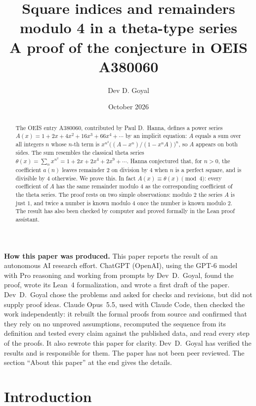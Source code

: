 \documentclass[11pt,a4paper]{article}
\title{Square indices and remainders modulo 4 in a theta-type series\\[6pt]\large A proof of the conjecture in OEIS A380060}
\author{Dev D. Goyal}
\date{October 2026}
\theoremstyle{definition}
\theoremstyle{remark}
\begin{document}
\maketitle
\begin{abstract}
The OEIS entry A380060, contributed by Paul D.~Hanna, defines a power series
$A(x)=1+2x+4x^2+16x^3+66x^4+\cdots$ by an implicit equation: $A$ equals a sum over all integers $n$ whose $n$-th term
is $x^{n^2}\bigl((A-x^n)/(1-x^nA)\bigr)^n$, so $A$ appears on both sides. The sum resembles the classical theta series
$\theta(x)=\sum_nx^{n^2}=1+2x+2x^4+2x^9+\cdots$. Hanna conjectured that, for $n>0$, the coefficient $a(n)$ leaves
remainder $2$ on division by $4$ when $n$ is a perfect square, and is divisible by $4$ otherwise. We prove this. In
fact $A(x)\equiv\theta(x)\pmod 4$: every coefficient of $A$ has the same remainder modulo $4$ as the corresponding
coefficient of the theta series. The proof rests on two simple observations: modulo $2$ the series $A$ is just $1$,
and twice a number is known modulo $4$ once the number is known modulo $2$. The result has also been checked by
computer and proved formally in the Lean proof assistant.
\end{abstract}
\begin{center}\begin{minipage}{0.88\linewidth}\small
\textbf{How this paper was produced.} This paper reports the result of an autonomous AI research effort.
ChatGPT (OpenAI), using the GPT-6 model with Pro reasoning and working from prompts by Dev~D.~Goyal, found the proof, wrote its Lean~4 formalization, and wrote a first draft of the paper.
Dev~D.~Goyal chose the problems and asked for checks and revisions, but did not supply proof ideas.
Claude Opus~5.5, used with Claude Code, then checked the work independently: it rebuilt the formal proofs from
source and confirmed that they rely on no unproved assumptions, recomputed the sequence from its definition and tested
every claim against the published data, and read every step of the proofs. It also rewrote this paper for clarity.
Dev~D.~Goyal has verified the results and is responsible for them. The paper has not been peer reviewed.
The section ``About this paper'' at the end gives the details.
\end{minipage}\end{center}

\section{Introduction}
\end{document}
